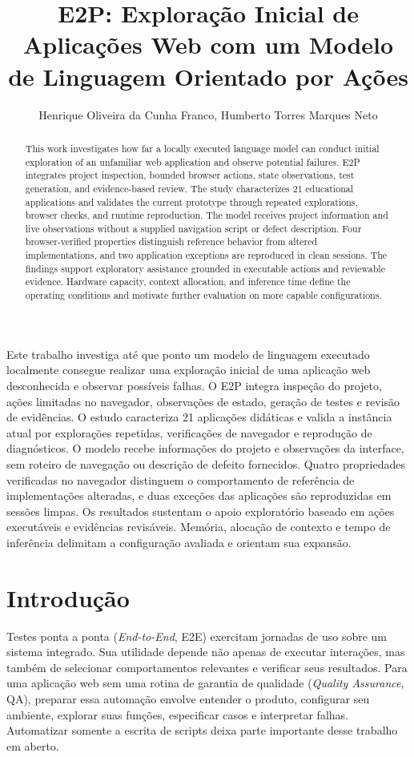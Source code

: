 \documentclass[12pt]{article}
\title{E2P: Exploração Inicial de Aplicações Web com um Modelo de Linguagem Orientado por Ações}
\author{Henrique Oliveira da Cunha Franco\inst{1}, Humberto Torres Marques Neto\inst{1}}
\begin{document}
\maketitle
\begin{otherlanguage}{english}
\begin{abstract}
This work investigates how far a locally executed language model can conduct initial exploration of an unfamiliar web application and observe potential failures. E2P integrates project inspection, bounded browser actions, state observations, test generation, and evidence-based review. The study characterizes 21 educational applications and validates the current prototype through repeated explorations, browser checks, and runtime reproduction. The model receives project information and live observations without a supplied navigation script or defect description. Four browser-verified properties distinguish reference behavior from altered implementations, and two application exceptions are reproduced in clean sessions. The findings support exploratory assistance grounded in executable actions and reviewable evidence. Hardware capacity, context allocation, and inference time define the operating conditions and motivate further evaluation on more capable configurations.
\end{abstract}
\end{otherlanguage}
\begin{resumo}
Este trabalho investiga até que ponto um modelo de linguagem executado localmente consegue realizar uma exploração inicial de uma aplicação web desconhecida e observar possíveis falhas. O E2P integra inspeção do projeto, ações limitadas no navegador, observações de estado, geração de testes e revisão de evidências. O estudo caracteriza 21 aplicações didáticas e valida a instância atual por explorações repetidas, verificações de navegador e reprodução de diagnósticos. O modelo recebe informações do projeto e observações da interface, sem roteiro de navegação ou descrição de defeito fornecidos. Quatro propriedades verificadas no navegador distinguem o comportamento de referência de implementações alteradas, e duas exceções das aplicações são reproduzidas em sessões limpas. Os resultados sustentam o apoio exploratório baseado em ações executáveis e evidências revisáveis. Memória, alocação de contexto e tempo de inferência delimitam a configuração avaliada e orientam sua expansão.
\end{resumo}

\section{Introdução}\label{sec:intro}
Testes ponta a ponta (\textit{End-to-End}, E2E) exercitam jornadas de uso sobre um sistema integrado. Sua utilidade depende não apenas de executar interações, mas também de selecionar comportamentos relevantes e verificar seus resultados. Para uma aplicação web sem uma rotina de garantia de qualidade (\textit{Quality Assurance}, QA), preparar essa automação envolve entender o produto, configurar seu ambiente, explorar suas funções, especificar casos e interpretar falhas. Automatizar somente a escrita de scripts deixa parte importante desse trabalho em aberto.
\end{document}
